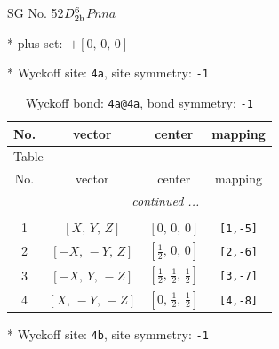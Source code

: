\documentclass[fleqn,8pt]{jsarticle}
\begin{document}
\setcounter{MaxMatrixCols}{32}

\renewcommand{\tablename}{Table~}
\renewcommand{\figurename}{Figure~}
\begin{center}
\LARGE
SG No. 52\quad$D_{\rm 2h}^{6}$\quad$Pnna$\quad[ orthorhombic ]
\end{center}

* plus set:\,\,\,$+\left[ 0,\, 0,\, 0 \right]$


* Wyckoff site: {\tt 4a}, site symmetry: {\tt -1}
\renewcommand{\arraystretch}{1.2}
\begin{longtable}{cccc}
\caption{Wyckoff bond: {\tt 4a@4a}, bond symmetry: {\tt -1}}
 \\
 \hline \hline
No. & vector & center & mapping \\ \hline \endfirsthead

\multicolumn{3}{l}{\tablename\ \thetable{}} \\
 \hline \hline
No. & vector & center & mapping \\ \hline \endhead

 \hline \hline
\multicolumn{3}{r}{\footnotesize\it continued ...} \\ \endfoot

 \hline \hline
\multicolumn{3}{r}{} \\ \endlastfoot

1 & $\left[ X,\, Y,\, Z \right]$ & $\left[ 0,\, 0,\, 0 \right]$ & {\tt [1,-5]} \\ \hline
2 & $\left[ - X,\, - Y,\, Z \right]$ & $\left[ \frac{1}{2},\, 0,\, 0 \right]$ & {\tt [2,-6]} \\ \hline
3 & $\left[ - X,\, Y,\, - Z \right]$ & $\left[ \frac{1}{2},\, \frac{1}{2},\, \frac{1}{2} \right]$ & {\tt [3,-7]} \\ \hline
4 & $\left[ X,\, - Y,\, - Z \right]$ & $\left[ 0,\, \frac{1}{2},\, \frac{1}{2} \right]$ & {\tt [4,-8]} \\
\end{longtable}
* Wyckoff site: {\tt 4b}, site symmetry: {\tt -1}
\renewcommand{\arraystretch}{1.2}
\end{document}

